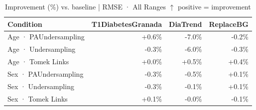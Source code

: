 \begin{table}[htbp]
\centering
\small
\caption{Improvement (\%) vs. baseline  |  RMSE · All Ranges  $\uparrow$ positive = improvement}
\label{tab:delta_rmse_entire_family_size_undersampling}
\begin{tabular}{lrrr}
\toprule
\textbf{Condition} & \textbf{T1DiabetesGranada} & \textbf{DiaTrend} & \textbf{ReplaceBG} \\
\midrule
Age · PAUndersampling & \textcolor{OliveGreen}{+0.6\%} & \textcolor{BrickRed}{-7.0\%} & \textcolor{BrickRed}{-0.2\%} \\
Age · Undersampling & \textcolor{BrickRed}{-0.3\%} & \textcolor{BrickRed}{-6.0\%} & \textcolor{BrickRed}{-0.3\%} \\
Age · Tomek Links & \textcolor{OliveGreen}{+0.0\%} & \textcolor{OliveGreen}{+0.5\%} & \textcolor{OliveGreen}{+0.4\%} \\
\midrule
Sex · PAUndersampling & \textcolor{BrickRed}{-0.3\%} & \textcolor{BrickRed}{-0.5\%} & \textcolor{OliveGreen}{+0.1\%} \\
Sex · Undersampling & \textcolor{BrickRed}{-0.3\%} & \textcolor{BrickRed}{-0.1\%} & \textcolor{OliveGreen}{+0.1\%} \\
Sex · Tomek Links & \textcolor{OliveGreen}{+0.1\%} & \textcolor{BrickRed}{-0.0\%} & \textcolor{BrickRed}{-0.1\%} \\
\bottomrule
\end{tabular}
\end{table}
